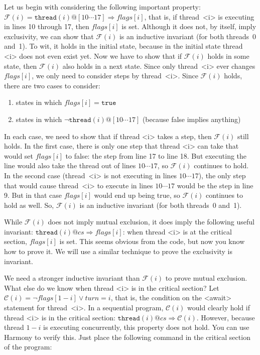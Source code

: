 \documentclass{report}
\begin{document}
Let us begin with considering the following important property:
$\mathcal{F}(i) = \mathtt{thread}(i)@[10 \cdots 17] \Rightarrow \mathit{flags}[i]$,
that is, if thread~<{i}> is executing in lines 10 through 17, then $\mathit{flags}[i]$
is set.
Although it does not, by itself, imply exclusivity, we can show that
$\mathcal{F}(i)$ is an inductive invariant (for both threads~0 and~1).
To wit, it holds in the initial state, because in the initial state thread <{i}> does
not even exist yet.
Now we have to show that if $\mathcal{F}(i)$ holds in some state, then
$\mathcal{F}(i)$ also holds in a next state.
Since only thread~<{i}> ever changes $\mathit{flags}[i]$, we only need to
consider steps by thread~<{i}>.
Since $\mathcal{F}(i)$ holds, there are two cases to consider:
\begin{enumerate}
\item states in which $\mathit{flags}[i] = \texttt{true}$
\item states in which $\lnot \mathtt{thread}(i)@[10 \cdots 17]$
(because false implies anything)
\end{enumerate}
In each case, we need to show that if thread <{i}> takes a step, then
$\mathcal{F}(i)$ still holds.
In the first case, there is only one step that thread <{i}> can take that would
set $\mathit{flags}[i]$ to false: the step from line 17 to line 18.  But executing the line
would also take the thread out of lines $10 \cdots 17$, so $\mathcal{F}(i)$ continues to hold.
In the second case (thread~<{i}> is not executing in lines $10 \cdots 17$), the only step
that would cause thread~<{i}> to execute in lines $10 \cdots 17$ would be the step in line 9.
But in that case $\mathit{flags}[i]$ would end up being true, so
$\mathcal{F}(i)$ continues to hold as well.
So, $\mathcal{F}(i)$ is an inductive invariant (for both threads~0 and~1).

While $\mathcal{F}(i)$ does not imply mutual exclusion, it does imply the following useful
invariant: $\mathtt{thread}(i)@cs \Rightarrow \mathit{flags}[i]$: when thread <{i}> is
at the critical section, $\mathit{flags}[i]$ is set.  This seems obvious from the code,
but now you know how to prove it.
We will use a similar technique to prove the exclusivity is invariant.

We need a stronger inductive invariant than $\mathcal{F}(i)$ to prove mutual exclusion.
What else do we know when thread <{i}> is in the critical section?
Let $\mathcal{C}(i) = \lnot\mathit{flags}[1 - i] \lor \mathit{turn} = i$, that is,
the condition on the <{await}> statement for thread~<{i}>.
In a sequential program, $\mathcal{C}(i)$ would clearly hold if thread <{i}> is in
the critical section: $\mathtt{thread}(i)@cs \Rightarrow \mathcal{C}(i)$.
However, because thread $1-i$ is executing concurrently, this property does not
hold.
You can use Harmony to verify this.  Just place the following command
in the critical section of the program:
\end{document}
